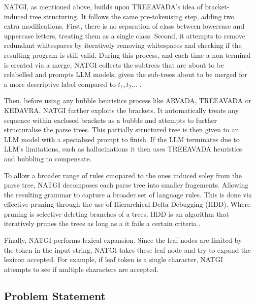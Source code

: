 \vspace{\baselineskip}

NATGI, as mentioned above, builds upon TREEAVADA's idea of bracket-induced tree structuring. It follows the same pre-tokenising step, adding two extra modifications. First, there is no separation of class between lowercase and uppercase letters, treating them as a single class. Second, it attempts to remove redundant whitespaces by iteratively removing whitespaces and checking if the resulting program is still valid. During this process, and each time a non-terminal is created via a merge, NATGI collects the subtrees that are about to be relabelled and prompts LLM models, given the sub-trees about to be merged for a more descriptive label compared to $t_1, t_2 ...$ .

\vspace{\baselineskip}
Then, before using any bubble heuristics process like ARVADA, TREEAVADA or KEDAVRA, NATGI further exploits the brackets. It automatically treats any sequence within enclosed brackets as a bubble and attempts to further structuralise the parse trees. This partially structured tree is then given to an LLM model with a specialised prompt to finish. If the LLM terminates due to LLM's limitations, such as hallucinations \cite{orvalhoAreLargeLanguage2025a,arefinBlackboxContextfreeGrammar2025,} it then uses TREEAVADA heuristics and bubbling to compensate.

\vspace{\baselineskip}
To allow a broader range of rules cmopared to the ones induced soley from the parse tree, NATGI decomposes each parse tree into smaller fragements. Allowing the resulting grammar to capture a broader set of language rules. This is done via effective pruning through the use of Hierarchical Delta Debugging (HDD). Where pruning is selective deleting branches of a trees. HDD is an algorithm that iteratively prunes the trees as long as a it fails a certain criteria \cite{misherghiHDDHierarchicalDelta2006a}. 

\vspace{\baselineskip}
Finally, NATGI performs lexical expansion. Since the leaf nodes are limited by the token in the input string, NATGI takes these leaf node and try to expand the lexicon accepted. For example, if leaf token is a single character, NATGI attempts to see if multiple characters are accepted.


\subsection{Problem Statement}


